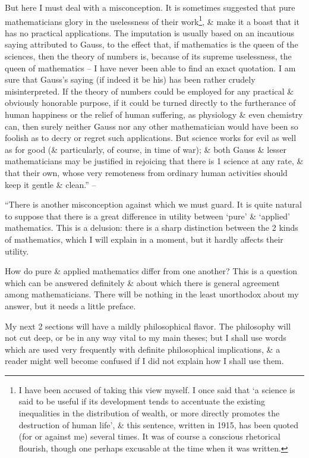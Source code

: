 \documentclass{article}
\numberwithin{equation}{section}
\begin{document}
But here I must deal with a misconception. It is sometimes suggested that pure mathematicians glory in the uselessness of their work\footnote{I have been accused of taking this view myself. I once said that `a science is said to be useful if its development tends to accentuate the existing inequalities in the distribution of wealth, or more directly promotes the destruction of human life', \& this sentence, written in 1915, has been quoted (for or against me) several times. It was of course a conscious rhetorical flourish, though one perhaps excusable at the time when it was written.}, \& make it a boast that it has no practical applications. The imputation is usually based on an incautious saying attributed to Gauss, to the effect that, if mathematics is the queen of the sciences, then the theory of numbers is, because of its supreme uselessness, the queen of mathematics -- I have never been able to find an exact quotation. I am sure that Gauss's saying (if indeed it be his) has been rather crudely misinterpreted. If the theory of numbers could be employed for any practical \& obviously honorable purpose, if it could be turned directly to the furtherance of human happiness or the relief of human suffering, as physiology \& even chemistry can, then surely neither Gauss nor any other mathematician would have been so foolish as to decry or regret such applications. But science works for evil as well as for good (\& particularly, of course, in time of war); \& both Gauss \& lesser mathematicians may be justified in rejoicing that there is 1 science at any rate, \& that their own, whose very remoteness from ordinary human activities should keep it gentle \& clean.'' -- \cite[pp. 119--121]{Hardy1992}

 ``There is another misconception against which we must guard. It is quite natural to suppose that there is a great difference in utility between `pure' \& `applied' mathematics. This is a delusion: there is a sharp distinction between the 2 kinds of mathematics, which I will explain in a moment, but it hardly affects their utility.

How do pure \& applied mathematics differ from one another? This is a question which can be answered definitely \& about which there is general agreement among mathematicians. There will be nothing in the least unorthodox about my answer, but it needs a little preface.

My next 2 sections will have a mildly philosophical flavor. The philosophy will not cut deep, or be in any way vital to my main theses; but I shall use words which are used very frequently with definite philosophical implications, \& a reader might well become confused if I did not explain how I shall use them.
\end{document}
